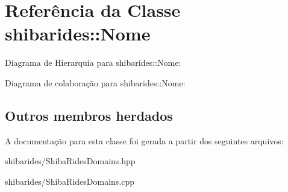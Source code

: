 \hypertarget{classshibarides_1_1Nome}{}\section{Referência da Classe shibarides\+:\+:Nome}
\label{classshibarides_1_1Nome}


Diagrama de Hierarquia para shibarides\+:\+:Nome\+:


Diagrama de colaboração para shibarides\+:\+:Nome\+:
\subsection*{Outros membros herdados}


A documentação para esta classe foi gerada a partir dos seguintes arquivos\+:\begin{DoxyCompactItemize}
\item 
shibarides/Shiba\+Rides\+Domains.\+hpp\item 
shibarides/Shiba\+Rides\+Domains.\+cpp\end{DoxyCompactItemize}
